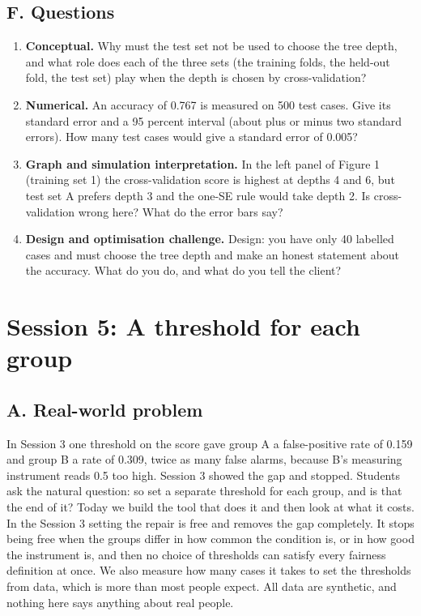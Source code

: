 \documentclass[11pt,a4paper]{article}
\begin{document}
\subsection*{F. Questions}
\begin{enumerate}[nosep]
\item \textbf{Conceptual.} Why must the test set not be used to choose the tree depth, and what role does each of the three sets (the training folds, the held-out fold, the test set) play when the depth is chosen by cross-validation?
\item \textbf{Numerical.} An accuracy of 0.767 is measured on 500 test cases. Give its standard error and a 95 percent interval (about plus or minus two standard errors). How many test cases would give a standard error of 0.005?
\item \textbf{Graph and simulation interpretation.} In the left panel of Figure 1 (training set 1) the cross-validation score is highest at depths 4 and 6, but test set A prefers depth 3 and the one-SE rule would take depth 2. Is cross-validation wrong here? What do the error bars say?
\item \textbf{Design and optimisation challenge.} Design: you have only 40 labelled cases and must choose the tree depth and make an honest statement about the accuracy. What do you do, and what do you tell the client?
\end{enumerate}

\section{Session 5: A threshold for each group}

\subsection*{A. Real-world problem}
In Session 3 one threshold on the score gave group A a false-positive rate of 0.159 and group B a rate of 0.309, twice as many false alarms, because B's measuring instrument reads 0.5 too high. Session 3 showed the gap and stopped. Students ask the natural question: so set a separate threshold for each group, and is that the end of it? Today we build the tool that does it and then look at what it costs. In the Session 3 setting the repair is free and removes the gap completely. It stops being free when the groups differ in how common the condition is, or in how good the instrument is, and then no choice of thresholds can satisfy every fairness definition at once. We also measure how many cases it takes to set the thresholds from data, which is more than most people expect. All data are synthetic, and nothing here says anything about real people.
\end{document}
